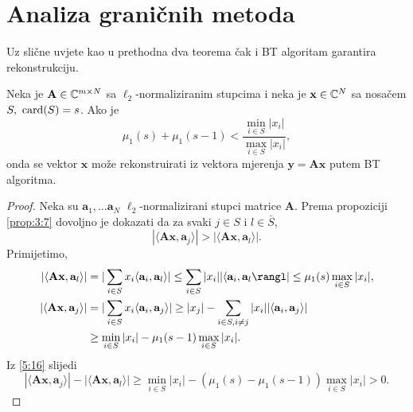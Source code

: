 \documentclass[a4paper,twoside,12pt]{memoir} %
\newcommand{\vect}[1]{\mathbf{#1}}
\renewcommand{\vec}{\vect}
\newcommand{\card}{\text{\normalfont{card}}}
\begin{document}
\section[Analiza grani\v{c}nih metoda][Analiza grani\v{c}nih metoda]{Analiza grani\v{c}nih metoda}
Uz sli\v{c}ne uvjete kao u prethodna dva teorema \v{c}ak i BT algoritam garantira rekonstrukciju.
\begin{thm}\label{tm:5:16}
    Neka je $\vec A \in \C^{m \times N}$ sa $\ell_2$-normaliziranim stupcima i neka je $\vec x \in \C^N$ sa nosa\v{c}em $S,\ \card(S) = s$. Ako je 
    \begin{equation}\label{5:16}
        \mu_1(s) + \mu_1(s-1) < \frac{\min_{i \in S}|x_i|}{\max_{i \in S}|x_i|}, 
    \end{equation}
    onda se vektor $\vec x$ mo\v{z}e rekonstruirati iz vektora mjerenja $\vec y = \vec{Ax}$ putem BT algoritma.
\end{thm}
\begin{proof}
    Neka su $\vec a_1, \dots \vec a_N$ $\ell_2$-normalizirani stupci matrice $\vec A$. Prema propoziciji \ref{prop:3:7} dovoljno je dokazati da za svaki $j \in S$ i $l \in \bar S$,
    \begin{equation}\label{5:17}
        |\langle \vec{Ax}, \vec a_j \rangle| >  |\langle \vec{Ax}, \vec a_l \rangle|.
    \end{equation}
    Primijetimo,
    \begin{align*}
        |\langle \vec{Ax}, \vec a_l \rangle| &= |\sum_{i \in S} x_i \langle \vec a_i, \vec a_l\rangle| \leq \sum_{i \in S} |x_i||\langle \vec a_i, \vec a_l \rangl| \leq \mu_1(s) \max_{i \in S} |x_i|,\\
        |\langle \vec{Ax}, \vec a_j \rangle| &=|\sum_{i \in S} x_i \langle \vec a_i, \vec a_j\rangle| \geq |x_j| - \sum_{i \in S, i \neq j}|x_i||\langle \vec a_i, \vec a_j \rangle| \\
        &\geq \min_{i \in S} |x_i| - \mu_1(s-1)\max_{i \in S}|x_i|.
    \end{align*}
    Iz \eqref{5:16} slijedi
    \begin{equation*}
        |\langle \vec{Ax}, \vec{a}_j \rangle| - |\langle \vec{Ax}, \vec{a}_l \rangle| \geq \min_{i \in S}|x_i| - (\mu_1(s) - \mu_1(s-1))\max_{i \in S} |x_i| > 0.
    \end{equation*}
\end{proof}
\end{document}
